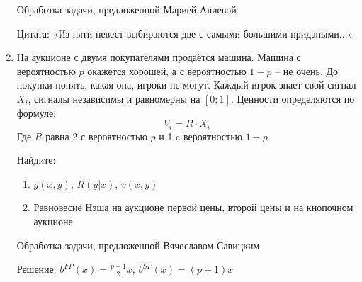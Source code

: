 \begin{enumerate}
Обработка задачи, предложенной Марией Алиевой

Цитата: «Из пяти невест выбираются две с самыми большими придаными...»

\item На аукционе с двумя покупателями продаётся машина. Машина с вероятностью $p$ окажется хорошей, а с вероятностью $1-p$ -- не очень. До покупки понять, какая она, игроки не могут. Каждый игрок знает свой сигнал $X_{i}$, сигналы независимы и равномерны на $[0;1]$. Ценности определяются по формуле:
\begin{equation}
V_{i}=R\cdot X_{i}
\end{equation}
Где $R$ равна 2 с вероятностью $p$ и 1 c вероятностью $1-p$.

Найдите:
\begin{enumerate}
\item $g(x,y)$, $R(y|x)$, $v(x,y)$
\item Равновесие Нэша на аукционе первой цены, второй цены и на кнопочном аукционе
\end{enumerate}

Обработка задачи, предложенной Вячеславом Савицким

Решение: $b^{FP}(x)=\frac{p+1}{2}x$, $b^{SP}(x)=(p+1)x$


\end{enumerate}
